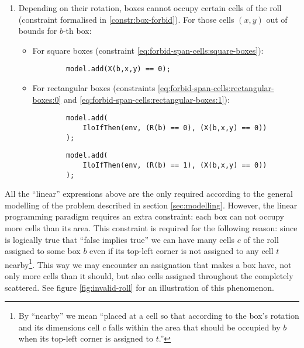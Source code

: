 \begin{enumerate}
	\item Depending on their rotation, boxes cannot occupy certain cells of the
	roll (constraint formalised in \ref{constr:box-forbid}). For those cells $(x,y)$
	out of bounds for $b$-th box:
    
	\begin{itemize}
		\item For square boxes (constraint \ref{eq:forbid-span-cells:square-boxes}):
		{\NOINDENT \begin{lstlisting}
		model.add(X(b,x,y) == 0);
		\end{lstlisting}}
		
		\item For rectangular boxes (constraints \ref{eq:forbid-span-cells:rectangular-boxes:0}
		and \ref{eq:forbid-span-cells:rectangular-boxes:1}):
		{\NOINDENT \begin{lstlisting}
		model.add(
			IloIfThen(env, (R(b) == 0), (X(b,x,y) == 0))
		);
		\end{lstlisting}}
		{\NOINDENT \begin{lstlisting}
		model.add(
			IloIfThen(env, (R(b) == 1), (X(b,x,y) == 0))
		);
		\end{lstlisting}}
	\end{itemize}
    
\end{enumerate}

All the ``linear'' expressions above are the only required according to the
general modelling of the problem described in section \ref{sec:modelling}. However,
the linear programming paradigm requires an extra constraint: each box can not
occupy more cells than its area. This constraint is required for the following
reason: since is logically true that ``false implies true'' we can have many
cells $c$ of the roll assigned to some box $b$ even if its top-left corner is not
assigned to any cell $t$ nearby\footnote{By ``nearby'' we mean ``placed at a cell so that
according to the box's rotation and its dimensions cell $c$ falls within the
area that should be occupied by $b$ when its top-left corner is assigned to $t$.''}.
This way we may encounter an assignation that makes a box have, not only more cells
than it should, but also cells assigned throughout the completely scattered.
See figure \ref{fig:invalid-roll} for an illustration of this phenomenon.

